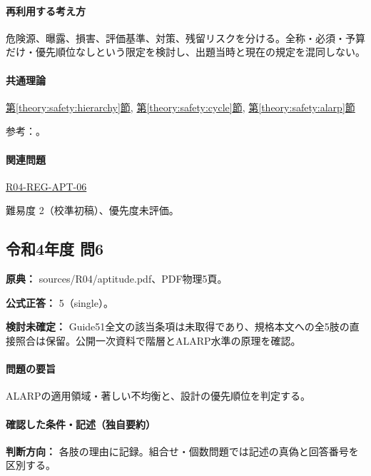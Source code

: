 \paragraph{再利用する考え方} 危険源、曝露、損害、評価基準、対策、残留リスクを分ける。全称・必須・予算だけ・優先順位なしという限定を検討し、出題当時と現在の規定を混同しない。

\paragraph{共通理論} \hyperref[theory:safety:hierarchy]{第\ref*{theory:safety:hierarchy}節}, \hyperref[theory:safety:cycle]{第\ref*{theory:safety:cycle}節}, \hyperref[theory:safety:alarp]{第\ref*{theory:safety:alarp}節}

\par 参考：\cite{saf_ra2006,saf_guide51,saf_parliament2006}。

\paragraph{関連問題} \hyperref[q:r04-reg-apt-06]{R04-REG-APT-06}

\par 難易度 2（校準初稿）、優先度未評価。

\subsection{令和4年度 問6}
\label{q:r04-reg-apt-06}

\noindent\textbf{原典：} sources/R04/aptitude.pdf、PDF物理5頁。

\textbf{公式正答：} 5（single）。

\par\textbf{検討未確定：} Guide51全文の該当条項は未取得であり、規格本文への全5肢の直接照合は保留。公開一次資料で階層とALARP水準の原理を確認。

\paragraph{問題の要旨} ALARPの適用領域・著しい不均衡と、設計の優先順位を判定する。

\paragraph{確認した条件・記述（独自要約）}\mbox{}\par

\noindent\textbf{判断方向：} 各肢の理由に記録。組合せ・個数問題では記述の真偽と回答番号を区別する。\par

